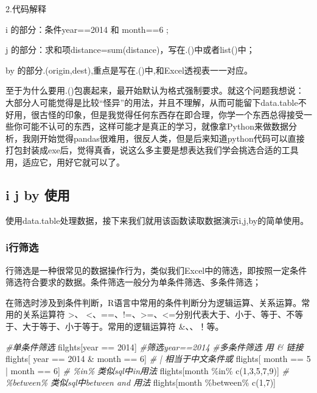 \documentclass[
]{book}
\newenvironment{Shaded}{\begin{snugshade}}{\end{snugshade}}
\newcommand{\CommentTok}[1]{\textcolor[rgb]{0.56,0.35,0.01}{\textit{#1}}}
\newcommand{\DecValTok}[1]{\textcolor[rgb]{0.00,0.00,0.81}{#1}}
\newcommand{\FunctionTok}[1]{\textcolor[rgb]{0.00,0.00,0.00}{#1}}
\newcommand{\NormalTok}[1]{#1}
\newcommand{\SpecialCharTok}[1]{\textcolor[rgb]{0.00,0.00,0.00}{#1}}
\begin{document}
2.代码解释

i 的部分：条件year==2014 和 month==6 ;

j 的部分：求和项distance=sum(distance)，写在.()中或者list()中；

by 的部分.(origin,dest),重点是写在.()中,和Excel透视表一一对应。

至于为什么要用.()包裹起来，最开始默认为格式强制要求。就这个问题我想说：大部分人可能觉得是比较``怪异''的用法，并且不理解，从而可能留下data.table不好用，很古怪的印象，但是我觉得任何东西存在即合理，你学一个东西总得接受一些你可能不认可的东西，这样可能才是真正的学习，就像拿Python来做数据分析，我刚开始觉得pandas很难用，很反人类，但是后来知道python代码可以直接打包封装成exe后，觉得真香，说这么多主要是想表达我们学会挑选合适的工具用，适应它，用好它就可以了。

\hypertarget{i-j-by-ux4f7fux7528}{%
\subsection{i j by 使用}\label{i-j-by-ux4f7fux7528}}

使用data.table处理数据，接下来我们就用该函数读取数据演示i,j,by的简单使用。

\hypertarget{iux884cux7b5bux9009}{%
\subsubsection{i行筛选}\label{iux884cux7b5bux9009}}

行筛选是一种很常见的数据操作行为，类似我们Excel中的筛选，即按照一定条件筛选符合要求的数据。条件筛选一般分为单条件筛选、多条件筛选；

在筛选时涉及到条件判断，R语言中常用的条件判断分为逻辑运算、关系运算。常用的关系运算符 \textgreater、 \textless、==、!=、\textgreater=、\textless=分别代表大于、小于、等于、不等于、大于等于、小于等于。常用的逻辑运算符 \&、\textbar、！等。

\begin{Shaded}
\begin{Highlighting}[]
\CommentTok{\#单条件筛选}
\NormalTok{filghts[year }\SpecialCharTok{==} \DecValTok{2014}\NormalTok{] }\CommentTok{\#筛选year==2014}
\CommentTok{\#多条件筛选 用 \& 链接}
\NormalTok{flights[ year }\SpecialCharTok{==} \DecValTok{2014} \SpecialCharTok{\&}\NormalTok{ month }\SpecialCharTok{==} \DecValTok{6}\NormalTok{] }
\CommentTok{\# | 相当于中文条件或 }
\NormalTok{flights[ month }\SpecialCharTok{==} \DecValTok{5} \SpecialCharTok{|}\NormalTok{ month }\SpecialCharTok{==} \DecValTok{6}\NormalTok{] }
\CommentTok{\# \%in\% 类似sql中in用法}
\NormalTok{flights[month }\SpecialCharTok{\%in\%} \FunctionTok{c}\NormalTok{(}\DecValTok{1}\NormalTok{,}\DecValTok{3}\NormalTok{,}\DecValTok{5}\NormalTok{,}\DecValTok{7}\NormalTok{,}\DecValTok{9}\NormalTok{)] }
\CommentTok{\# \%between\% 类似sql中between and 用法}
\NormalTok{flights[month }\SpecialCharTok{\%between\%} \FunctionTok{c}\NormalTok{(}\DecValTok{1}\NormalTok{,}\DecValTok{7}\NormalTok{)]}
\end{Highlighting}
\end{Shaded}
\end{document}
